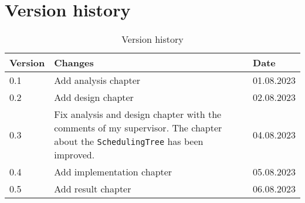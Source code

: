 \chapter{Version history}
\label{chap:report-versions}

\begin{table}[ht]
   \centering
   \begin{tabular}{|m{}|m{}|m{}|}
      \hline
      \textbf{Version} & \textbf{Changes} & \textbf{Date} \\ [0.5ex]
      \hline
      0.1 & Add analysis chapter & 01.08.2023  \\
      \hline
      0.2 & Add design chapter & 02.08.2023  \\
      \hline
      0.3 & Fix analysis and design chapter with the comments of my supervisor.
      The chapter about the \texttt{SchedulingTree} has been improved.
      & 04.08.2023  \\
      \hline
      0.4 & Add implementation chapter & 05.08.2023  \\
      \hline
      0.5 & Add result chapter & 06.08.2023  \\
      \hline
   \end{tabular}
   \caption{Version history}
   \label{tab:version-history}
\end{table}